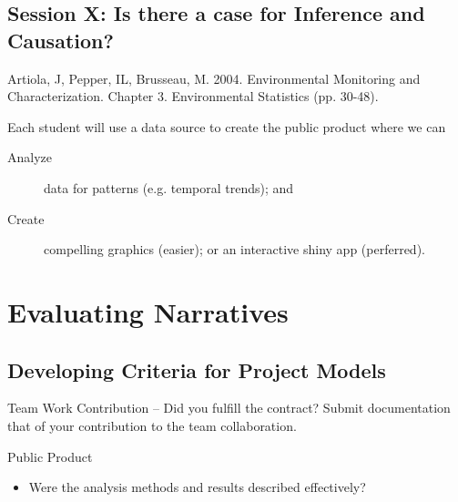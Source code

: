 \documentclass{article}\usepackage[]{graphicx}\usepackage[]{color}
\newenvironment{itemize*}%
  {\begin{itemize}%
    \setlength{\itemsep}{0pt}%
    \setlength{\parskip}{0pt}}%
  {\end{itemize}}
\begin{document}
\subsection{Session X: Is there a case for Inference and Causation?}

  \begin{itemize*}
  		\item Artiola, J, Pepper, IL, Brusseau, M. 2004. Environmental Monitoring and Characterization. Chapter 3. Environmental Statistics (pp. 30-48).
\end{itemize*}

Each student will use a data source to create the public product where we can 
\begin{description}
  \item[Analyze] data for patterns (e.g. temporal trends); and
  \item[Create] compelling graphics (easier); or an interactive shiny app (perferred).
\end{description}


\section{Evaluating Narratives}

\subsection{Developing Criteria for Project Models}

\begin{itemize*}
  \item Team Work Contribution -- Did you fulfill the contract? Submit documentation that of your contribution to the team collaboration.
  \item Public Product
    \begin{itemize}
      \item Were the analysis methods and results described effectively?
    \end{itemize}

\end{itemize*}
\end{document}
